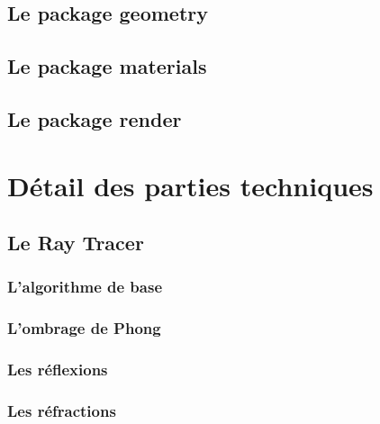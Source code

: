 \documentclass[11pt]{article}
\begin{document}
	\subsection{Le package geometry}
	    

        \subsection{Le package materials}
            

        \subsection{Le package render}
        	



\section{Détail des parties techniques}
    \subsection{Le Ray Tracer}
        \subsubsection{L'algorithme de base}
            \label{rayTracingBase}

            

        \subsubsection{L'ombrage de Phong}
            \label{ombragePhong}

            

        \subsubsection{Les réflexions}

            

        \subsubsection{Les réfractions}
            \label{refractions}
\end{document}
